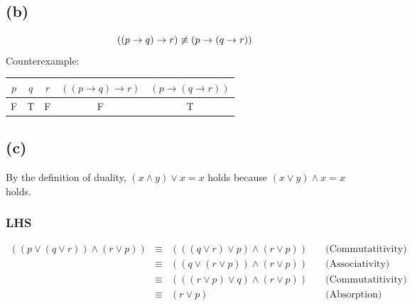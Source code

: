 \documentclass{article} %
\begin{document}
\subsection*{(b)}
\begin{equation}
    ((p \to q) \to r) \not\equiv (p \to (q \to r))\\
\end{equation}
Counterexample:
\begin{table}[htbp]
    \begin{tabular}{|c|c|c|c|c|}
    \hline
    $p$ & $q$ & $r$ & $((p \to q) \to r)$ & $(p \to (q \to r))$ \\ \hline
    F   & T   & F   & F                   & T                   \\ \hline
    \end{tabular}
\end{table}
\subsection*{(c)}
By the definition of duality, $(x \wedge y) \vee x = x$ holds because $(x \vee y) \wedge x = x$ holds.\\
\subsubsection*{LHS}
\[\begin{array}{rllr}
    ((p \vee (q \vee r)) \wedge (r \vee p)) &\equiv& (((q \vee r) \vee p) \wedge (r \vee p))    &\quad\mbox{(Commutatitivity)}\\
                                            &\equiv& ((q \vee (r \vee p)) \wedge (r \vee p))    &\quad\mbox{(Associativity)}\\
                                            &\equiv& (((r \vee p) \vee q) \wedge (r \vee p))    &\quad\mbox{(Commutatitivity)}\\
                                            &\equiv& (r \vee p)                                 &\quad\mbox{(Absorption)}\\
\end{array}\]
\end{document}
